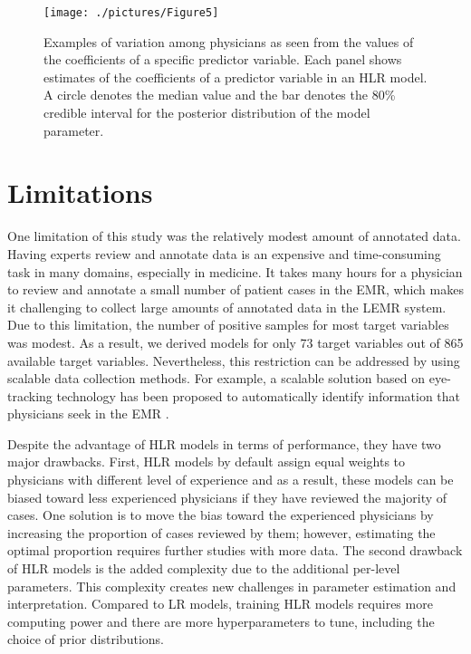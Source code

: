 \begin{figure}[!h]
    \centering
    \texttt{[image: ./pictures/Figure5]}
    \caption{
    Examples of variation among physicians as seen from the values of the coefficients of a specific predictor variable. Each panel shows estimates of the coefficients of a predictor variable in an HLR model. A circle denotes the median value and the bar denotes the 80\% credible interval for the posterior distribution of the model parameter.
    }\label{fig:5}
\end{figure}

\section{Limitations}\label{sec:limitations}
One limitation of this study was the relatively modest amount of annotated data. Having experts review and annotate data is an expensive and time-consuming task in many domains, especially in medicine. It takes many hours for a physician to review and annotate a small number of patient cases in the EMR, which makes it challenging to collect large amounts of annotated data in the LEMR system. Due to this limitation, the number of positive samples for most target variables was modest. As a result, we derived models for only 73 target variables out of 865 available target variables. Nevertheless, this restriction can be addressed by using scalable data collection methods. For example, a scalable solution based on eye-tracking technology has been proposed to automatically identify information that physicians seek in the EMR \cite{King2017}.

Despite the advantage of HLR models in terms of performance, they have two major drawbacks. First, HLR models by default assign equal weights to physicians with different level of experience and as a result, these models can be biased toward less experienced physicians if they have reviewed the majority of cases. One solution is to move the bias toward the experienced physicians by increasing the proportion of cases reviewed by them; however, estimating the optimal proportion requires further studies with more data. The second drawback of HLR models is the added complexity due to the additional per-level parameters. This complexity creates new challenges in parameter estimation and interpretation. Compared to LR models, training HLR models requires more computing power and there are more hyperparameters to tune, including the choice of prior distributions.

